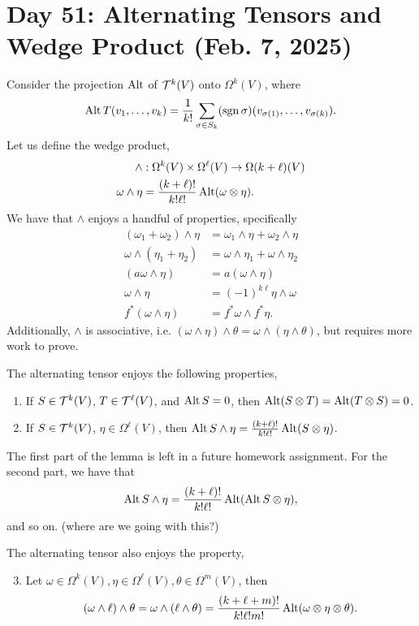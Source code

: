 \section{Day 51: Alternating Tensors and Wedge Product (Feb. 7, 2025)}
Consider the projection $\operatorname{Alt}$ of $\mathcal T^k(V)$ onto $\Omega^k(V)$, where
\[ \operatorname{Alt} T(v_1, \dots, v_k) = \frac{1}{k!} \sum_{\sigma \in S_k} (\operatorname{sgn} \sigma) (v_{\sigma(1)}, \dots, v_{\sigma(k)}). \]
Let us define the wedge product,
\begin{align*}
    \wedge &: \Omega^k(V) \times \Omega^\ell(V) \to \Omega(k + \ell)(V) \\
    \omega \wedge \eta &= \frac{(k + \ell)!}{k! \ell!} \operatorname{Alt}(\omega \otimes \eta).
\end{align*}
We have that $\wedge$ enjoys a handful of properties, specifically
\begin{align*}
    (\omega_1 + \omega_2) \wedge \eta &= \omega_1 \wedge \eta + \omega_2 \wedge \eta \\
    \omega \wedge (\eta_1 + \eta_2) &= \omega \wedge \eta_1 + \omega \wedge \eta_2 \\
    (a\omega \wedge \eta) &= a (\omega \wedge \eta) \\
    \omega \wedge \eta &= (-1)^{k \ell} \eta \wedge \omega \\
    f^\ast (\omega \wedge \eta) &= f^\ast \omega \wedge f^\ast \eta.
\end{align*}
Additionally, $\wedge$ is associative, i.e. $(\omega \wedge \eta) \wedge \theta = \omega \wedge (\eta \wedge \theta)$, but requires more work to prove.
\begin{simplelemma}[Spivak 4-4]
    The alternating tensor enjoys the following properties,
    \begin{enumerate}[label=(\roman*)]
        \item If $S \in \mathcal T^k(V)$, $T \in \mathcal T^\ell(V)$, and $\operatorname{Alt} S = 0$, then $\operatorname{Alt} (S \otimes T) = \operatorname{Alt} (T \otimes S) = 0$.
        \item If $S \in \mathcal T^k(V)$, $\eta \in \Omega^\ell(V)$, then $\operatorname{Alt} S \wedge \eta = \frac{(k+\ell)!}{k! \ell!} \operatorname{Alt}(S \otimes \eta)$.
    \end{enumerate}
\end{simplelemma}
\noindent The first part of the lemma is left in a future homework assignment. For the second part, we have that
\[ \operatorname{Alt} S \wedge \eta = \frac{(k+\ell)!}{k! \ell!} \operatorname{Alt}(\operatorname{Alt} S \otimes \eta), \]
and so on. (where are we going with this?)
\begin{simplelemma}
    The alternating tensor also enjoys the property,
    \begin{enumerate}[label=(\roman*)]
        \setcounter{enumi}{2}
        \item Let $\omega \in \Omega^k(V), \eta \in \Omega^\ell(V), \theta \in \Omega^m(V)$, then
        \[ (\omega \wedge \ell) \wedge \theta = \omega \wedge (\ell \wedge \theta) = \frac{(k + \ell + m)!}{k! \ell! m!} \operatorname{Alt}(\omega \otimes \eta \otimes \theta). \]
    \end{enumerate}
\end{simplelemma}
